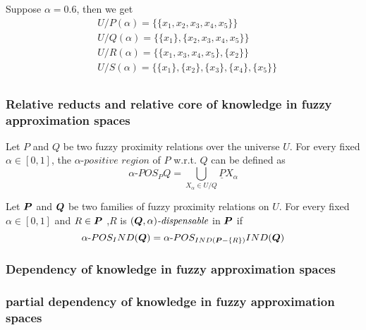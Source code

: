 \documentclass[11pt]{article}
\begin{document}
Suppose \(\alpha=0.6\), then we get
\begin{align*}
  &U/P(\alpha)=\{\{x_1,x_2,x_3,x_4,x_5\}\}\\
  &U/Q(\alpha)=\{\{x_1\},\{x_2,x_3,x_4,x_5\}\}\\
  &U/R(\alpha)=\{\{x_1,x_3,x_4,x_5\},\{x_2\}\}\\
  &U/S(\alpha)=\{\{x_1\},\{x_2\},\{x_3\},\{x_4\},\{x_5\}\}\\
\end{align*}
\subsubsection{Relative reducts and relative core of knowledge in fuzzy approximation spaces}
\label{sec:orgff81e26}
\begin{definition}[]
Let \(P\) and \(Q\) be two fuzzy proximity relations over the universe \(U\). For
every fixed \(\alpha\in[0,1]\), the \(\alpha\textit{-positive region}\) of \(P\) w.r.t. \(Q\)
can be defined as
\begin{equation*}
\alpha\text{-}POS_P Q=\displaystyle\bigcup_{X_\alpha\in U/Q} \underline{P}X_\alpha
\end{equation*}
\end{definition}
\begin{definition}[]
Let \(\boldsymbol{P}\) and \(\boldsymbol{Q}\) be two families of fuzzy proximity relations on \(U\). For
every fixed \(\alpha\in [0,1]\) and \(R\in \boldsymbol{P}\) ,\(R\) is
\((\boldsymbol{Q},\alpha)\textit{-dispensable}\) in \(\boldsymbol{P}\) if 
\begin{equation*}
\alpha\text{-}POS_IND (\boldsymbol{Q})=\alpha\text{-}POS_{IND(\boldsymbol{P}-\left\{ R\right\})}IND(\boldsymbol{Q})
\end{equation*}
\end{definition}

\subsubsection{Dependency of knowledge in fuzzy approximation spaces}
\label{sec:org00ede04}
\subsubsection{partial dependency of knowledge in fuzzy approximation spaces}
\label{sec:orgac210d1}
\end{document}
